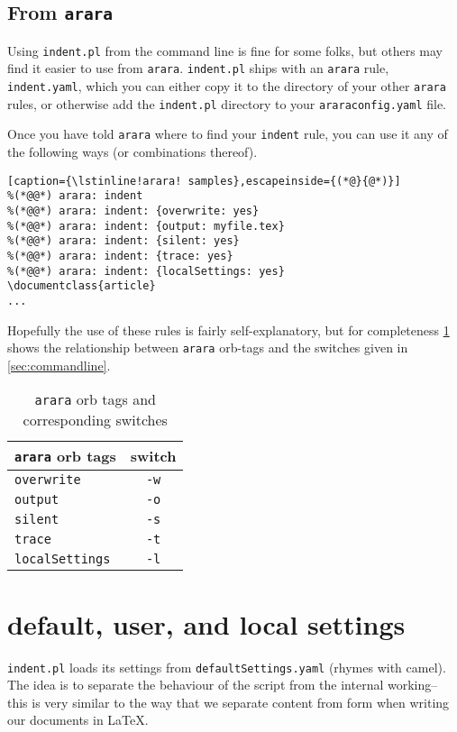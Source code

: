  \subsection{From \lstinline!arara!}
 	Using \lstinline!indent.pl! from the command line is fine for some folks, but
 	others may find it easier to use from \lstinline!arara!. \lstinline!indent.pl!
 	ships with an \lstinline!arara! rule, \lstinline!indent.yaml!, which you can either copy it to the directory of
 	your other \lstinline!arara! rules, or otherwise add the \lstinline!indent.pl!
 	directory to your \lstinline!araraconfig.yaml! file.
 	 	 	 	 	
 	Once you have told \lstinline!arara! where to find your \lstinline!indent! rule, 
 	you can use it any of the following ways (or combinations thereof). 
 	 	 	 	 	
 	\begin{lstlisting}[caption={\lstinline!arara! samples},escapeinside={(*@}{@*)}]
%(*@@*) arara: indent
%(*@@*) arara: indent: {overwrite: yes}
%(*@@*) arara: indent: {output: myfile.tex}
%(*@@*) arara: indent: {silent: yes}
%(*@@*) arara: indent: {trace: yes}
%(*@@*) arara: indent: {localSettings: yes}
\documentclass{article}
...
 	\end{lstlisting}
 	 	 	 	 	
 	Hopefully the use of these rules is fairly self-explanatory, but for completeness
 	\cref{tab:orbsandswitches} shows the relationship between \lstinline!arara! orb-tags and the 
 	switches given in \cref{sec:commandline}.
 	 	 	 	 	
 	\begin{table}[!ht]
 		\centering
 		\caption{\lstinline!arara! orb tags and corresponding switches}
 		\label{tab:orbsandswitches}
 		\begin{tabular}{lc}
 			\toprule
 			\lstinline!arara! orb tags & switch         \\
 			\midrule
 			\lstinline!overwrite!      & \lstinline!-w! \\
 			\lstinline!output!         & \lstinline!-o! \\
 			\lstinline!silent!         & \lstinline!-s! \\
 			\lstinline!trace!          & \lstinline!-t! \\
 			\lstinline!localSettings!  & \lstinline!-l! \\
 			\bottomrule
 		\end{tabular}
 	\end{table}
\section{default, user, and local settings}\label{sec:defuseloc}
 \lstinline!indent.pl! loads its settings from \lstinline!defaultSettings.yaml! 
 (rhymes with camel). The idea is to separate the behaviour of the script 
 from the internal working-- this is very similar to the way that we separate content
 from form when writing our documents in \LaTeX.
     
